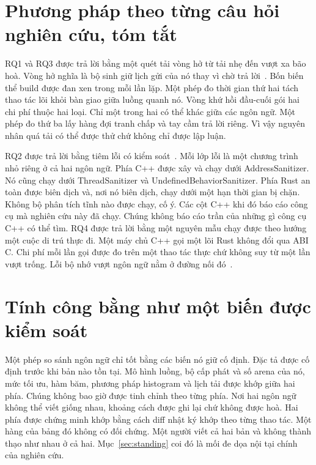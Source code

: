 \section[Phương pháp theo từng câu hỏi]{Phương pháp theo từng câu hỏi nghiên cứu, tóm tắt}\label{sec:methodbrief}
RQ1 và RQ3 được trả lời bằng một quét tải vòng hở từ tải nhẹ đến vượt xa bão hoà. Vòng hở nghĩa
là bộ sinh giữ lịch gửi của nó thay vì chờ trả
lời~\cite{schroeder2006openclosed}. Bốn biến thể build được đan xen trong mỗi lần lặp. Một phép
đo thời gian thứ hai tách thao tác lõi khỏi bàn giao giữa luồng quanh nó. Vòng khứ hồi đầu-cuối
gói hai chi phí thuộc hai loại. Chỉ một trong hai có thể khác giữa các ngôn ngữ. Một phép đo
thứ ba lấy hàng đợi tranh chấp và tay cầm trả lời riêng. Vì vậy nguyên nhân quá tải có thể được
thử chứ không chỉ được lập luận.

RQ2 được trả lời bằng tiêm lỗi có kiểm soát~\cite{natella2016fault}. Mỗi lớp lỗi là một chương
trình nhỏ riêng ở cả hai ngôn ngữ. Phía C++ được xây và chạy dưới AddressSanitizer. Nó cũng
chạy dưới ThreadSanitizer và UndefinedBehaviorSanitizer. Phía Rust an toàn được biên dịch và,
nơi nó biên dịch, chạy dưới một hạn thời gian bị chặn. Không bộ phân tích tĩnh nào được chạy,
cố ý. Các cột C++ khi đó báo cáo công cụ mà nghiên cứu này đã chạy. Chúng không báo cáo trần
của những gì công cụ C++ có thể tìm. RQ4 được trả lời bằng một nguyên mẫu chạy được theo hướng
một cuộc di trú thực đi. Một máy chủ C++ gọi một lõi Rust không đổi qua ABI C. Chi phí mỗi lần
gọi được đo trên một thao tác thực chứ không suy từ một lần vượt trống. Lỗi bộ nhớ vượt ngôn
ngữ nằm ở đường nối đó~\cite{li2022crosslang}.

\section{Tính công bằng như một biến được kiểm soát}\label{sec:controlsbrief}
Một phép so sánh ngôn ngữ chỉ tốt bằng các biến nó giữ cố định. Đặc tả được cố định trước khi
bản nào tồn tại. Mô hình luồng, bộ cấp phát và số arena của nó, mức tối ưu, hàm băm, phương
pháp histogram và lịch tải được khớp giữa hai phía. Chúng không bao giờ được tinh chỉnh theo
từng phía. Nơi hai ngôn ngữ không thể viết giống nhau, khoảng cách được ghi lại chứ không được
hoà. Hai phía được chứng minh khớp bằng cách diff nhật ký khớp theo từng thao tác. Một hàng của
bảng đó không có đối chứng. Một người viết cả hai bản và không thành thạo như nhau ở cả hai.
Mục~\ref{sec:standing} coi đó là mối đe dọa nội tại chính của nghiên cứu.

